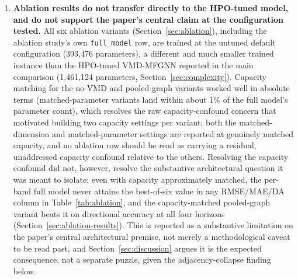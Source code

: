 \documentclass[journal]{IEEEtran}
\begin{document}
\begin{enumerate}
    \item \textbf{Ablation results do not transfer directly to the HPO-tuned model, and do not support the paper's central claim at the configuration tested.} All six ablation variants (Section~\ref{sec:ablation}), including the ablation study's own \texttt{full\_model} row, are trained at the untuned default configuration (393{,}476 parameters), a different and much smaller trained instance than the HPO-tuned VMD-MFGNN reported in the main comparison (1{,}461{,}124 parameters, Section~\ref{sec:complexity}). Capacity matching for the no-VMD and pooled-graph variants worked well in absolute terms (matched-parameter variants land within about 1\% of the full model's parameter count), which resolves the raw capacity-confound concern that motivated building two capacity settings per variant; both the matched-dimension and matched-parameter settings are reported at genuinely matched capacity, and no ablation row should be read as carrying a residual, unaddressed capacity confound relative to the others. Resolving the capacity confound did not, however, resolve the substantive architectural question it was meant to isolate: even with capacity approximately matched, the per-band full model never attains the best-of-six value in any RMSE/MAE/DA column in Table~\ref{tab:ablation}, and the capacity-matched pooled-graph variant beats it on directional accuracy at all four horizons (Section~\ref{sec:ablation-results}). This is reported as a substantive limitation on the paper's central architectural premise, not merely a methodological caveat to be read past, and Section~\ref{sec:discussion} argues it is the expected consequence, not a separate puzzle, given the adjacency-collapse finding below.

\end{enumerate}
\end{document}
